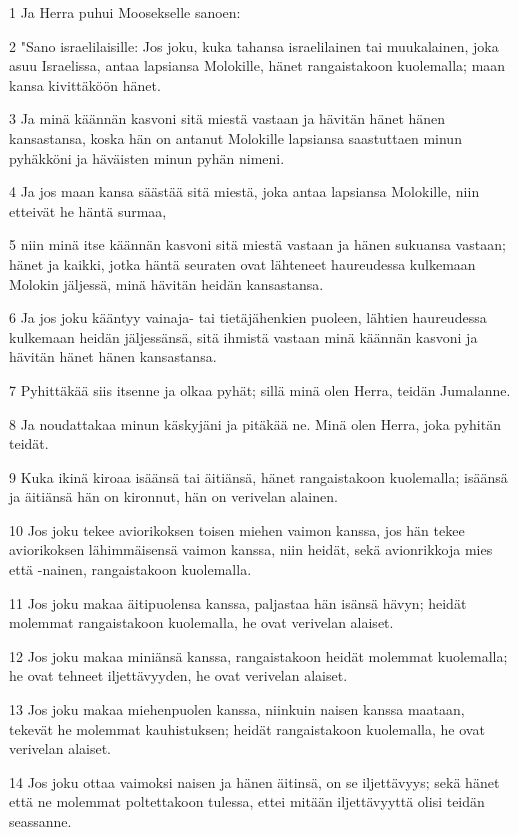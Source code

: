 \par 1 Ja Herra puhui Moosekselle sanoen:
\par 2 "Sano israelilaisille: Jos joku, kuka tahansa israelilainen tai muukalainen, joka asuu Israelissa, antaa lapsiansa Molokille, hänet rangaistakoon kuolemalla; maan kansa kivittäköön hänet.
\par 3 Ja minä käännän kasvoni sitä miestä vastaan ja hävitän hänet hänen kansastansa, koska hän on antanut Molokille lapsiansa saastuttaen minun pyhäkköni ja häväisten minun pyhän nimeni.
\par 4 Ja jos maan kansa säästää sitä miestä, joka antaa lapsiansa Molokille, niin etteivät he häntä surmaa,
\par 5 niin minä itse käännän kasvoni sitä miestä vastaan ja hänen sukuansa vastaan; hänet ja kaikki, jotka häntä seuraten ovat lähteneet haureudessa kulkemaan Molokin jäljessä, minä hävitän heidän kansastansa.
\par 6 Ja jos joku kääntyy vainaja- tai tietäjähenkien puoleen, lähtien haureudessa kulkemaan heidän jäljessänsä, sitä ihmistä vastaan minä käännän kasvoni ja hävitän hänet hänen kansastansa.
\par 7 Pyhittäkää siis itsenne ja olkaa pyhät; sillä minä olen Herra, teidän Jumalanne.
\par 8 Ja noudattakaa minun käskyjäni ja pitäkää ne. Minä olen Herra, joka pyhitän teidät.
\par 9 Kuka ikinä kiroaa isäänsä tai äitiänsä, hänet rangaistakoon kuolemalla; isäänsä ja äitiänsä hän on kironnut, hän on verivelan alainen.
\par 10 Jos joku tekee aviorikoksen toisen miehen vaimon kanssa, jos hän tekee aviorikoksen lähimmäisensä vaimon kanssa, niin heidät, sekä avionrikkoja mies että -nainen, rangaistakoon kuolemalla.
\par 11 Jos joku makaa äitipuolensa kanssa, paljastaa hän isänsä hävyn; heidät molemmat rangaistakoon kuolemalla, he ovat verivelan alaiset.
\par 12 Jos joku makaa miniänsä kanssa, rangaistakoon heidät molemmat kuolemalla; he ovat tehneet iljettävyyden, he ovat verivelan alaiset.
\par 13 Jos joku makaa miehenpuolen kanssa, niinkuin naisen kanssa maataan, tekevät he molemmat kauhistuksen; heidät rangaistakoon kuolemalla, he ovat verivelan alaiset.
\par 14 Jos joku ottaa vaimoksi naisen ja hänen äitinsä, on se iljettävyys; sekä hänet että ne molemmat poltettakoon tulessa, ettei mitään iljettävyyttä olisi teidän seassanne.
